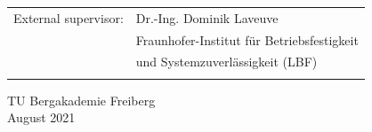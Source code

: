 \begin{titlepage}
\begin{center}
\begin{tabular}{l l}
    \hspace*{1cm} \large {External supervisor:} & \hspace*{1cm}\large{Dr.-Ing. Dominik Laveuve }\\
    \hspace*{1cm}  & \hspace*{1cm}\large{Fraunhofer-Institut für Betriebsfestigkeit}\\ 
    \hspace*{1cm}  & \hspace*{1cm}\large{und Systemzuverlässigkeit (LBF) }\\\\  
   \end{tabular}

    \vspace*{1.7cm}
    \large { TU Bergakademie Freiberg } \\
     \vspace*{0.3cm}
    \large { August 2021 }
   
   
   
	\end{center}
\end{titlepage}